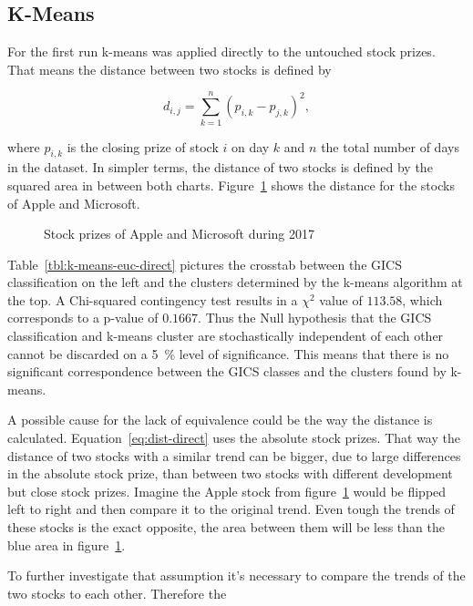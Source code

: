 
\subsection{K-Means}\label{sec:k-means}

For the first run k-means was applied directly to the untouched stock prizes. That means the distance between two stocks is defined by

\begin{equation}\label{eq:dist-direct}
d_{i,j} = \sum^{n}_{k = 1} {(p_{i,k} - p_{j,k})^2},
\end{equation}

where $p_{i,k}$ is the closing prize of stock $i$ on day $k$ and $n$ the total number of days in the dataset. In simpler terms, the distance of two stocks is defined by the squared area in between both charts. Figure~\ref{fig:appl-vs-msft} shows the distance for the stocks of Apple and Microsoft.

\begin{figure}\label{fig:appl-vs-msft}
	\centering
	
	\caption{Stock prizes of Apple and Microsoft during 2017}
\end{figure}



Table~\ref{tbl:k-means-euc-direct} pictures the crosstab between the GICS classification on the left and the clusters determined by the k-means algorithm at the top. A Chi-squared contingency test results in a $\chi^2$ value of $113.58$, which corresponds to a p-value of $0.1667$. Thus the Null hypothesis that the GICS classification and k-means cluster are stochastically independent of each other cannot be discarded on a 5~\% level of significance. This means that there is no significant correspondence between the GICS classes and the clusters found by k-means.

A possible cause for the lack of equivalence could be the way the distance is calculated. Equation~\ref{eq:dist-direct} uses the absolute stock prizes. That way the distance of two stocks with a similar trend can be bigger, due to large differences in the absolute stock prize, than between two stocks with different development but close stock prizes. Imagine the Apple stock from figure~\ref{fig:appl-vs-msft} would be flipped left to right and then compare it to the original trend. Even tough the trends of these stocks is the exact opposite, the area between them will be less than the blue area in figure~\ref{fig:appl-vs-msft}.

To further investigate that assumption it's necessary to compare the trends of the two stocks to each other. Therefore the 
